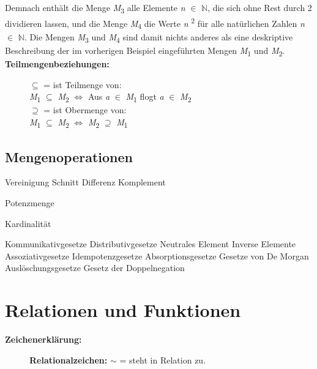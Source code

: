 Demnach enthält die Menge \textit{M}\textsubscript{3} alle Elemente \textit{n} $\in$ $\mathbb{N}$, die sich ohne
Rest durch 2 dividieren lassen, und die Menge \textit{M}\textsubscript{4} die Werte \textit{n} \textsuperscript{2} für alle natürlichen Zahlen \textit{n} $\in$ $\mathbb{N}$. Die Mengen \textit{M}\textsubscript{3} und \textit{M}\textsubscript{4} sind damit nichts anderes als eine deskriptive Beschreibung der im vorherigen
Beispiel eingeführten Mengen \textit{M}\textsubscript{1} und \textit{M}\textsubscript{2}.\\

\textbf{Teilmengenbeziehungen:}
\begin{figure}[H]
\centering

$\subseteq$ = ist Teilmenge von:\\ 
\textit{M}\textsubscript{1} $\subseteq$ \textit{M}\textsubscript{2} 
$\Leftrightarrow$ 
Aus \textit{a} $\in$ \textit{M}\textsubscript{1} flogt \textit{a} $\in$ \textit{M}\textsubscript{2}\\


$\supseteq$ = ist Obermenge von:\\
\textit{M}\textsubscript{1} $\subseteq$ \textit{M}\textsubscript{2}
$\Leftrightarrow$ 
\textit{M}\textsubscript{2} $\supseteq$ \textit{M}\textsubscript{1}\\

\end{figure}


\subsection{Mengenoperationen}

Vereinigung
Schnitt
Differenz
Komplement

Potenzmenge

Kardinalität

Kommunikativgesetze
Distributivgesetze
Neutrales Element
Inverse Elemente
Assoziativgesetze
Idempotenzgesetze
Absorptionsgesetze
Gesetze von De Morgan
Auslöschungsgesetze
Gesetz der Doppelnegation

\section{Relationen und Funktionen}

\textbf{Zeichenerklärung:}\\
\begin{figure}[h]
\centering
\textbf{Relationalzeichen:} \textit{$\sim$} = steht in Relation zu.\\
\end{figure}

